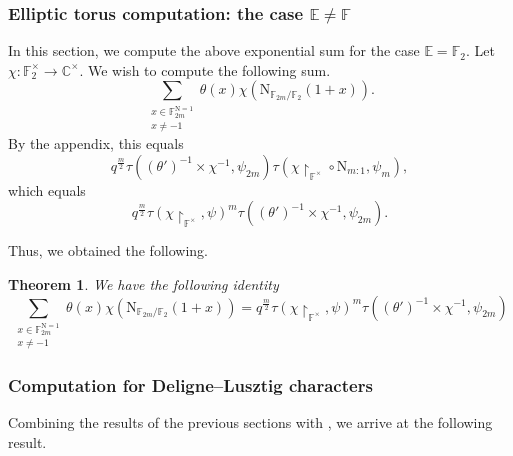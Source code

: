 \documentclass[12pt, reqno]{amsart}
\newtheorem{theorem}{Theorem}[section]
\theoremstyle{definition}
\theoremstyle{definition}
\theoremstyle{definition}
\newcommand{\cComplex}{\mathbb{C}}
\newcommand{\multiplicativegroup}[1]{#1^{\times}}
\newcommand{\fieldCharacter}{\psi}
\newcommand{\FieldNorm}[2]{\mathrm{N}_{#1:#2}}
\newcommand{\aFieldNorm}{\mathrm{N}}
\newcommand{\finiteField}{\mathbb{F}}
\newcommand{\quadraticExtension}{\mathbb{E}}
\newcommand{\finiteFieldExtension}[1]{\finiteField_{#1}}
\newcommand{\NormOneGroup}[1]{\finiteFieldExtension{#1}^{\aFieldNorm = 1}}
\newcommand{\GaussSumCharacter}[3]{\tau\left(#1 \times #2, #3\right)}
\begin{document}
\subsubsection{Elliptic torus computation: the case $\quadraticExtension \ne \finiteField$}
In this section, we compute the above exponential sum for the case $\quadraticExtension = \finiteFieldExtension{2}$. Let $\chi \colon \multiplicativegroup{\finiteFieldExtension{2}} \to \multiplicativegroup{\cComplex}$. We wish to compute the following sum.
$$\sum_{\substack{x \in \NormOneGroup{2m}\\
		x \ne -1}} \theta \left(x\right) \chi\left(\aFieldNorm_{\finiteFieldExtension{2m} \slash \finiteFieldExtension{2}}\left(1 + x\right)\right).$$
By the appendix, this equals
$$q^{\frac{m}{2}} \GaussSumCharacter{\left(\theta'\right)^{-1}}{\chi^{-1}}{\fieldCharacter_{2m}} \tau\left(\chi \restriction_{\multiplicativegroup{\finiteField}} \circ \FieldNorm{m}{1}, \fieldCharacter_m\right),$$
which equals
$$q^{\frac{m}{2}} \tau\left(\chi \restriction_{\multiplicativegroup{\finiteField}}, \fieldCharacter\right)^m \GaussSumCharacter{\left(\theta'\right)^{-1}}{\chi^{-1}}{\fieldCharacter_{2m}}.$$

Thus, we obtained the following.
\begin{theorem}
	We have the following identity $$\sum_{\substack{x \in \NormOneGroup{2m}\\
			x \ne -1}} \theta \left(x\right) \chi\left(\aFieldNorm_{\finiteFieldExtension{2m} \slash \finiteFieldExtension{2}}\left(1 + x\right)\right) = q^{\frac{m}{2}} \tau\left(\chi \restriction_{\multiplicativegroup{\finiteField}}, \fieldCharacter\right)^m \GaussSumCharacter{\left(\theta'\right)^{-1}}{\chi^{-1}}{\fieldCharacter_{2m}}$$
\end{theorem}

\subsubsection{Computation for Deligne--Lusztig characters}
Combining the results of the previous sections with , we arrive at the following result.
\end{document}
